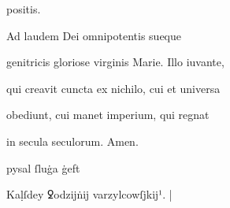 positis.	

Ad laudem Dei omnipotentis sueque 

genitricis gloriose virginis Marie. Illo iuvante,

qui creavit cuncta ex nichilo, cui et universa 

obediunt, cui manet imperium, qui regnat 

in secula seculorum. Amen.


pysal ſluġa ġeft

Kaḷſdey ꝿodzĳṅĳ varzylcowſjkĳ¹. |






\endinput




















\catcode `\^^M=5

  \newtip{48}{Łoś niesłusznie uważa, że \textit{bika} w obu wypadkach
    napisano błędnie zamiast \textit{ƀyka}. Przykłady są bowiem podane
    w~pisowni dotychczasowej dla pokazania jej niewystarczalności do
    zróżnicowania wyrazów \textit{bika} i \textit{byka}.} 

\obeylines






\newcommand{\margin}[1]{\annotatetextBlue{\{#1\}}{zapisy na marginesie}}



\renewcommand{\over}[1]{\annotatetextBlue{\{#1\}}{zapisy nad rządkami}}

\newcommand{\add}[1]{\annotatetextOlive{<#1>}{litery i wyrazy dodane, (których w tekście brak)}}

\newcommand{\extra}[1]{\colorbox{magenta!10}{[#1]}}

